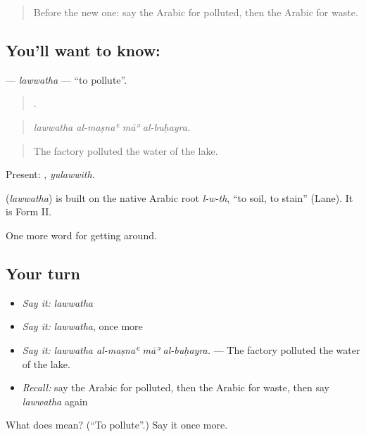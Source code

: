 \begin{quote}
Before the new one: say the Arabic for polluted, then the Arabic for waste.
\end{quote}

\subsection*{You'll want to know: }
\textbf{} — \emph{lawwatha} — \textquotedblleft{}to pollute\textquotedblright{}.

\begin{quote}
   .
\end{quote}

\begin{quote}
\emph{lawwatha al-maṣnaʿ māʾ al-buḥayra.}
\end{quote}

\begin{quote}
The factory polluted the water of the lake.
\end{quote}

Present: , \emph{yulawwith}.

\begin{cousinweb}
\textbf{} (\emph{lawwatha}) is built on the native Arabic root \emph{l-w-th}, \textquotedblleft{}to soil, to stain\textquotedblright{} (Lane). It is Form II.
\end{cousinweb}

\begin{grammarlens}[title={What you've built}]
One more word for getting around.
\end{grammarlens}

\subsection*{Your turn}
\begin{itemize}
\raggedright
  \item \emph{Say it:} \emph{lawwatha}
  \item \emph{Say it:} \emph{lawwatha}, once more
  \item \emph{Say it:} \emph{lawwatha al-maṣnaʿ māʾ al-buḥayra.} — The factory polluted the water of the lake.
  \item \emph{Recall:} say the Arabic for polluted, then the Arabic for waste, then say \emph{lawwatha} again
\end{itemize}

\begin{tcolorbox}[breakable,colback=teal!4,colframe=teal!35!black,title={Before you move on}]
What does  mean? (\textquotedblleft{}To pollute\textquotedblright{}.) Say it once more.
\end{tcolorbox}
